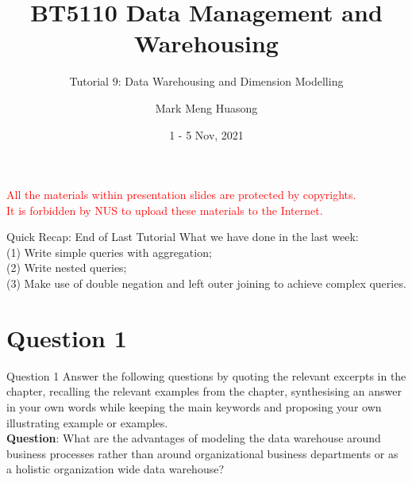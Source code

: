 \title{BT5110 Data Management and Warehousing}

\subtitle{Tutorial 9: Data Warehousing and Dimension Modelling}

\author{Mark Meng Huasong}



\date{1 - 5 Nov, 2021}

\begin{frame}
	\titlepage
	\begin{tcolorbox}
		\begin{center}
			{\scriptsize \textcolor{red}{All the materials within presentation slides are protected by copyrights.\\
					It is forbidden by NUS to upload these materials to the Internet.}}
		\end{center}
	\end{tcolorbox}
\end{frame}

\begin{frame}[fragile]{Quick Recap: End of Last Tutorial}
	What we have done in the last week:\\\vspace{5pt}
	(1) Write simple queries with aggregation;\\
	(2) Write nested queries;\\
	(3) Make use of double negation and left outer joining to achieve complex queries. \\\vspace{5pt}
	
\end{frame}

\section*{Question 1}

\begin{frame}[fragile]{Question 1}
Answer the following questions by quoting the relevant excerpts in the chapter, recalling the relevant examples from the chapter, synthesising an answer in your own words while keeping the main keywords and proposing your own illustrating example or examples.\\\vspace{10pt}
\textbf{Question}: What are the advantages of modeling the data warehouse around business processes rather than around organizational business departments or as a holistic organization wide data warehouse?
\end{frame}


